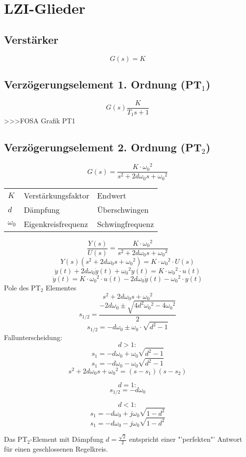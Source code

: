 \section{LZI-Glieder}

\subsection{Verstärker}
\[ G(s) = K \]

\subsection{Verzögerungselement 1. Ordnung (PT$_1$)}
\[ G(s) \frac{K}{T_1 s + 1} \]
>>>FOSA Grafik PT1

\subsection{Verzögerungselement 2. Ordnung (PT$_2$)}
\[ G(s) = \frac{K \cdot {\omega_0}^2}{s^2 + 2 d \omega_0 s + {\omega_0}^2} \]
\begin{tabular}{ll@{$ ~ \rightarrow ~ $}l}
$K$ & Verstärkungsfaktor & Endwert \\
$d$ & Dämpfung & Überschwingen \\
$\omega_0$ & Eigenkreisfrequenz & Schwingfrequenz \\
\end{tabular}
\[ \frac{Y(s)}{U(s)} = \frac{K \cdot {\omega_0}^2}{s^2 + 2 d \omega_0 s + {\omega_0}^2} \]
\[ Y(s) (s^2 + 2 d \omega_0 s + {\omega_0}^2) = K \cdot {\omega_0}^2 \cdot U(s) \]
\[ \ddot{y}(t) + 2 d \omega_0 \dot{y}(t) + {\omega_0}^2 y(t) = K \cdot {\omega_0}^2 \cdot u(t) \]
\[ \ddot{y}(t) = K \cdot {\omega_0}^2 \cdot u(t) - 2 d \omega_0 \dot{y}(t) - {\omega_0}^2 \cdot y(t) \]
Pole des PT$_2$ Elementes
\[ s^2 + 2 d \omega_0 s + {\omega_0}^2 \]
\[ s_{1/2} = \frac{-2 d \omega_0 \pm \sqrt{4 d^2 {\omega_0}^2 - 4 {\omega_0}^2}}{2} \]
\[ s_{1/2} = -d \omega_0 \pm \omega_0 \cdot \sqrt{d^2 - 1} \]
Fallunterscheidung: 
\[ d > 1: \]
\[ s_1 = -d \omega_0 + \omega_0 \sqrt{d^2 - 1} \]
\[ s_1 = -d \omega_0 - \omega_0 \sqrt{d^2 - 1} \]
\[ s^2 + 2 d \omega_0 s + {\omega_0}^2 = (s - s_1) (s - s_2) \]

\[ d = 1: \]
\[ s_{1/2} = -d\omega_0 \]

\[ d < 1: \]
\[ s_1 = -d\omega_0 + j \omega_0 \sqrt{1 - d^2} \]
\[ s_1 = -d\omega_0 - j \omega_0 \sqrt{1 - d^2} \]

Das PT$_2$-Element mit Dämpfung $d = \frac{\sqrt{2}}{2}$ entspricht einer 
"'perfekten"' Antwort für einen geschlossenen Regelkreis. 

